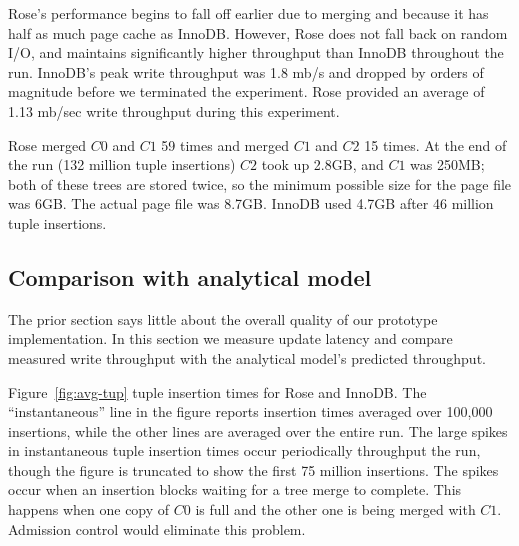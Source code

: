 \documentclass{vldb}
\newcommand{\rows}{Rose\xspace}
\newcommand{\rowss}{Rose's\xspace}
\newcommand{\xxx}[1]{\textcolor{red}{\bf XXX: #1}}
\renewcommand{\xxx}[1]{\xspace}
\begin{document}
\rowss performance begins to
fall off earlier due to merging and because it has half as much page
cache as InnoDB.  However, \rows does not fall back on random I/O, and
maintains significantly higher throughput than InnoDB throughout the
run.  InnoDB's peak write throughput was 1.8 mb/s and dropped by
orders of magnitude\xxx{final number} before we terminated the
experiment.  \rows provided an average of 1.13 mb/sec write throughput during this experiment.

\rows merged $C0$ and $C1$ 59 times and merged $C1$ and $C2$ 15 times.
At the end of the run (132 million tuple insertions) $C2$ took up
2.8GB, and $C1$ was 250MB; both of these trees are stored twice, so
the minimum possible size for the page file was 6GB.  The actual page
file was 8.7GB.\xxx{rerun to confirm pagefile size!}  InnoDB used
4.7GB after 46 million tuple insertions.




\subsection{Comparison with analytical model}

The prior section says little about the overall quality of our prototype
implementation.  In this section we measure update latency and compare
measured write throughput with the analytical model's predicted
throughput.

Figure~\ref{fig:avg-tup} tuple insertion times for \rows and InnoDB.
The ``instantaneous'' line in the figure reports insertion times
averaged over 100,000 insertions, while the other lines are averaged
over the entire run.  The large spikes in instantaneous tuple
insertion times occur periodically throughput the run, though the
figure is truncated to show the first 75 million insertions.\xxx{show
  the whole run???}  The spikes occur when an insertion blocks waiting
for a tree merge to complete.  This happens when one copy of $C0$ is
full and the other one is being merged with $C1$.  Admission control
would eliminate this problem.
\end{document}
